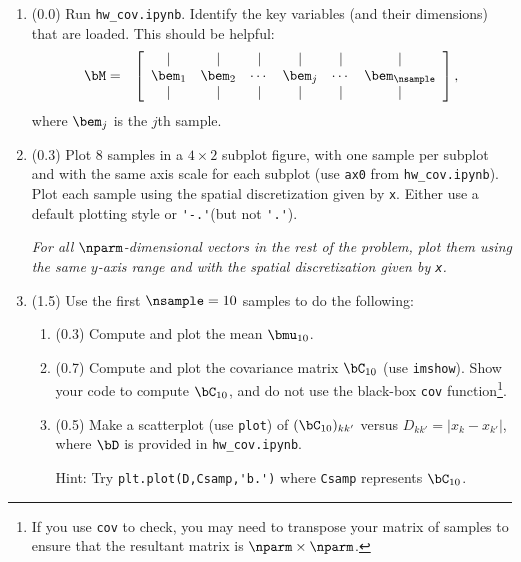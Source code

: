 \documentclass[11pt,titlepage,fleqn]{article}
\newcommand{\tfile}{{\tt hw\_cov.ipynb}}
\begin{document}
\begin{enumerate}

\item (0.0) Run \tfile. Identify the key variables (and their dimensions) that are loaded. This should be helpful:
%
\begin{eqnarray}
\bM &=& 
\left[ \begin{array}{cccccc}
| & | & | & | & | & | \\
\bem_1 & \bem_2 & \cdots & \bem_j & \cdots & \bem_\nsample \\
| & | & | & | & | & | \\
\end{array} \right],
\end{eqnarray}
%
where $\bem_j$ is the $j$th sample.

\item (0.3) Plot 8 samples in a $4 \times 2$ subplot figure, with one sample per subplot and with the same axis scale for each subplot (use \verb+ax0+ from \tfile). Plot each sample using the spatial discretization given by \verb+x+. Either use a default plotting style or \verb+'-.'+(but not \verb+'.'+).

{\em For all $\nparm$-dimensional vectors in the rest of the problem, plot them using the same $y$-axis range and with the spatial discretization given by \verb+x+.}

\label{samps}


\item (1.5) Use the first $\nsample=10$ samples to do the following:
%
\begin{enumerate}
\item (0.3) Compute and plot the mean $\bmu_{10}$.
\item (0.7) Compute and plot the covariance matrix $\bC_{10}$ (use \verb+imshow+). Show your code to compute $\bC_{10}$, and do not use the black-box \verb+cov+ function\footnote{If you use {\tt cov} to check, you may need to transpose your matrix of samples to ensure that the resultant matrix is $\nparm \times \nparm$.}.
\item (0.5) Make a scatterplot (use \verb+plot+) of $(\bC_{10})_{kk'}$ versus $D_{kk'} = |x_k - x_{k'}|$, where $\bD$ is provided in \tfile. 

Hint: Try \verb+plt.plot(D,Csamp,'b.')+ where \verb+Csamp+ represents $\bC_{10}$.
\end{enumerate}



\end{enumerate}
\end{document}
